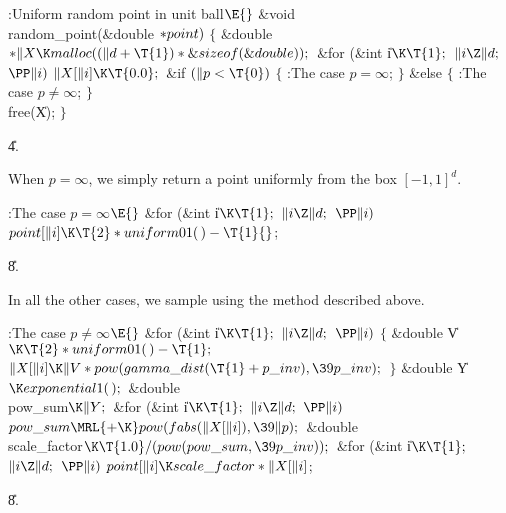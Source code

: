\Y\B\4:Uniform random point in unit ball\X${}\E{}$\6
\&{void} \\{random\_point}(\&{double} ${}{*}\\{point}){}$\1\1\2\2\6
${}\{{}$\1\6
\&{double} ${}{*}\|X\K\\{malloc}((\|d+\T{1})*\&{sizeof}(\&{double}));{}$\7
\&{for} (\&{int} \|i${}\K\T{1};{}$ ${}\|i\Z\|d;{}$ ${}\PP\|i){}$\1\5
${}\|X[\|i]\K\T{0.0};{}$\2\6
\&{if} ${}(\|p<\T{0}){}$\5
${}\{{}$\1\6
:The case $p=\infty$\X;\6
\4${}\}{}$\2\6
\&{else}\5
${}\{{}$\1\6
:The case $p\ne\infty$\X;\6
\4${}\}{}$\2\6
\\{free}(\|X);\6
\4${}\}{}$\2\par
\U4.\fi

When $p=\infty$, we simply return a point uniformly from the box
$[-1,1]^d$.

\Y\B\4:The case $p=\infty$\X${}\E{}$\6
\&{for} (\&{int} \|i${}\K\T{1};{}$ ${}\|i\Z\|d;{}$ ${}\PP\|i){}$\1\5
${}\\{point}[\|i]\K\T{2}*\\{uniform01}(\,)-\T{1}{}$;\2\par
\U8.\fi

In all the other cases, we sample using the method described above.

\Y\B\4:The case $p\ne\infty$\X${}\E{}$\6
\&{for} (\&{int} \|i${}\K\T{1};{}$ ${}\|i\Z\|d;{}$ ${}\PP\|i){}$\5
${}\{{}$\1\6
\&{double} \|V${}\K\T{2}*\\{uniform01}(\,)-\T{1};{}$\7
${}\|X[\|i]\K\|V*\\{pow}(\\{gamma\_dist}(\T{1}+\\{p\_inv}),\39\\{p\_inv});{}$\6
\4${}\}{}$\2\7
\&{double} \|Y${}\K\\{exponential1}(\,);{}$\6
\&{double} \\{pow\_sum}${}\K\|Y;{}$\7
\&{for} (\&{int} \|i${}\K\T{1};{}$ ${}\|i\Z\|d;{}$ ${}\PP\|i){}$\1\5
${}\\{pow\_sum}\MRL{+{\K}}\\{pow}(\\{fabs}(\|X[\|i]),\39\|p);{}$\2\7
\&{double} \\{scale\_factor}${}\K\T{1.0}/(\\{pow}(\\{pow\_sum},\39\\{p%
\_inv}));{}$\7
\&{for} (\&{int} \|i${}\K\T{1};{}$ ${}\|i\Z\|d;{}$ ${}\PP\|i){}$\1\5
${}\\{point}[\|i]\K\\{scale\_factor}*\|X[\|i]{}$;\2\par
\U8.\fi


